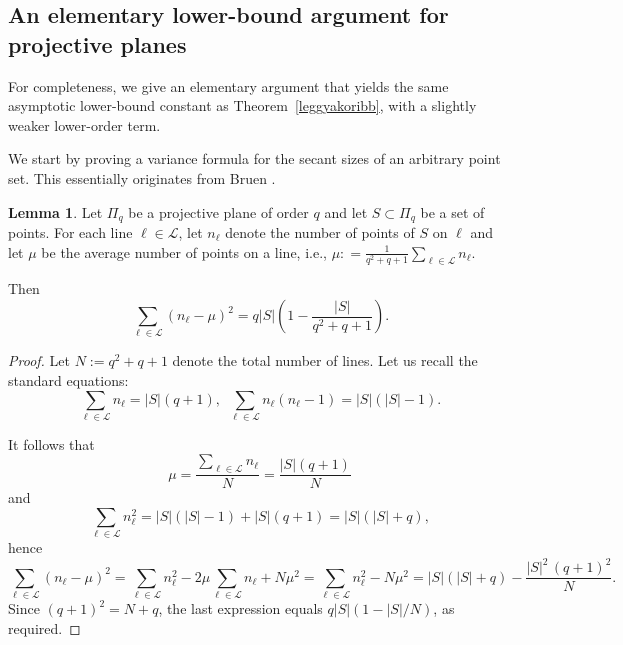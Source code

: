 \documentclass[10pt]{article}
\newcommand{\cL}{\mathcal{L}}
\theoremstyle{definition}
\newtheorem{lemma}[thm]{Lemma}
\newcommand{\zsst}[1]{%
	\bgroup
	\markoverwith{\textcolor{magenta}{\rule[0.5ex]{2pt}{1.2pt}}}%
	\ULon{#1}%
	\egroup
}
\begin{document}
	\newpage
	
	\begin{appendices}
		\section[An elementary lower-bound argument for projective planes]{{An elementary lower-bound argument for projective planes}}
		{For completeness, we give an elementary argument that yields the same asymptotic lower-bound constant as Theorem~\ref{leggyakoribb}, with a slightly weaker lower-order term.}
		
		
		
		{We start by proving a variance formula for the secant sizes of an arbitrary point set.} This essentially originates from Bruen \cite{Br}.
		\begin{lemma}
			\label{lem:standard}
			Let $\Pi_q$ be a projective plane of order $q$  and let $S\subset \Pi_q$ be a set of points.
			{For each line $\ell\in \cL$, let $n_{\ell}$ denote the number of points of $S$ on $\ell$ and let} $\mu$ be the average number of points on a line, i.e., 
			$\mu: =  \frac{1}{q^2+q+1}\sum_{\ell\in \cL} n_{\ell}$.
			
			Then
			\[
			\sum_{\ell\in \cL}(n_{\ell}-\mu)^2 
			= q|S|\left(1-\frac{|S|}{q^2+q+1}\right).%
			\]
		\end{lemma}
		
		\begin{proof}  %
			Let $N:=q^2+q+1$ denote the total number of lines.
			Let us recall the standard equations:
			\begin{equation}
				\sum_{\ell\in \cL} n_{\ell} = |S|(q+1), \ \
				\sum_{\ell\in \cL} n_{\ell}(n_{\ell}-1) = |S|(|S|-1).
			\end{equation}
			
			It follows that 
			\[
			\mu=\frac{\sum_{\ell\in \cL}n_{\ell}}{N}=\frac{|S|(q+1)}{N}
			\]
			and 
			\[
			\sum_{\ell\in \cL} n_{\ell}^2
			= |S|(|S|-1)+|S|(q+1)=|S|(|S|+q),
			\]
			hence
			\begin{equation}
				\sum_{\ell\in \cL}(n_{\ell}-\mu)^2
				=\sum_{\ell\in \cL}n_{\ell}^2-2\mu\sum_{\ell\in \cL}n_{\ell}+N\mu^2
				=\sum_{\ell\in \cL}n_{\ell}^2-N\mu^2
				=|S|(|S|+q)-\frac{|S|^2\,(q+1)^2}{N}.
			\end{equation}
			{Since \((q+1)^2=N+q\), the last expression equals
				\(q|S|(1-|S|/N)\), as required.}
			

\end{proof}
\end{appendices}
\end{document}
